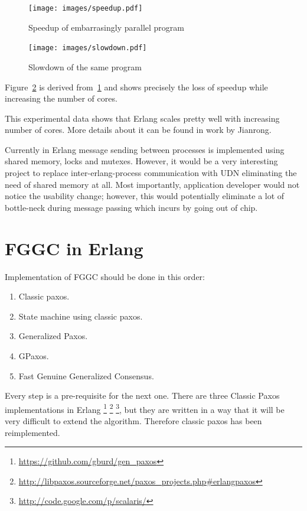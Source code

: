 \documentclass[english,11pt]{l4proj}
\newcommand{\fggc}{Fast Genuine Generalized Consensus}
\begin{document}
\begin{figure}
    \centering
    \texttt{[image: images/speedup.pdf]}
    \caption{Speedup of embarrasingly parallel program}
    \label{fig:parallel_speedup}
\end{figure}

\begin{figure}
    \centering
    \texttt{[image: images/slowdown.pdf]}
    \caption{Slowdown of the same program}
    \label{fig:parallel_slowdown}
\end{figure}

Figure~\ref{fig:parallel_slowdown} is derived from~\ref{fig:parallel_speedup}
and shows precisely the loss of speedup while increasing the number of cores.

This experimental data shows that Erlang scales pretty well with increasing
number of cores. More details about it can be found in work by
Jianrong\cite{erlang-manycore-scalability}.

Currently in Erlang message sending between processes is implemented using
shared memory, locks and mutexes. However, it would be a very interesting
project to replace inter-erlang-process communication with UDN eliminating the
need of shared memory at all. Most importantly, application developer would not
notice the usability change; however, this would potentially eliminate a lot of
bottle-neck during message passing which incurs by going out of chip.

\section{FGGC in Erlang}
\label{sec:paxos-api}

Implementation of FGGC should be done in this order:

\begin{enumerate}
    \item Classic paxos.
    \item State machine using classic paxos.
    \item Generalized Paxos.
    \item GPaxos.
    \item \fggc.
\end{enumerate}

Every step is a pre-requisite for the next one. There are three Classic Paxos
implementations in Erlang \footnote{\url{https://github.com/gburd/gen\_paxos}}
\footnote{\url{http://libpaxos.sourceforge.net/paxos\_projects.php\#erlangpaxos}}
\footnote{\url{http://code.google.com/p/scalaris/}}, but they are written in a
way that it will be very difficult to extend the algorithm. Therefore classic
paxos has been reimplemented.
\end{document}
